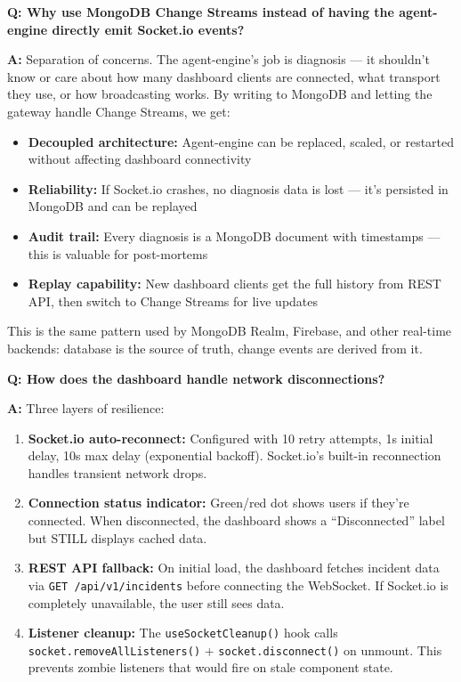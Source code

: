 \documentclass[11pt,a4paper]{article}
\begin{document}
\begin{interviewbox}
\textbf{Q: Why use MongoDB Change Streams instead of having the agent-engine directly emit Socket.io events?}

\textbf{A:} Separation of concerns. The agent-engine's job is diagnosis — it shouldn't know or care about how many dashboard clients are connected, what transport they use, or how broadcasting works. By writing to MongoDB and letting the gateway handle Change Streams, we get:

\begin{itemize}[leftmargin=*,itemsep=2pt]
  \item \textbf{Decoupled architecture:} Agent-engine can be replaced, scaled, or restarted without affecting dashboard connectivity
  \item \textbf{Reliability:} If Socket.io crashes, no diagnosis data is lost — it's persisted in MongoDB and can be replayed
  \item \textbf{Audit trail:} Every diagnosis is a MongoDB document with timestamps — this is valuable for post-mortems
  \item \textbf{Replay capability:} New dashboard clients get the full history from REST API, then switch to Change Streams for live updates
\end{itemize}

This is the same pattern used by MongoDB Realm, Firebase, and other real-time backends: database is the source of truth, change events are derived from it.
\end{interviewbox}

\begin{interviewbox}
\textbf{Q: How does the dashboard handle network disconnections?}

\textbf{A:} Three layers of resilience:

\begin{enumerate}[leftmargin=*,itemsep=2pt]
  \item \textbf{Socket.io auto-reconnect:} Configured with 10 retry attempts, 1s initial delay, 10s max delay (exponential backoff). Socket.io's built-in reconnection handles transient network drops.
  \item \textbf{Connection status indicator:} Green/red dot shows users if they're connected. When disconnected, the dashboard shows a ``Disconnected'' label but STILL displays cached data.
  \item \textbf{REST API fallback:} On initial load, the dashboard fetches incident data via \texttt{GET /api/v1/incidents} before connecting the WebSocket. If Socket.io is completely unavailable, the user still sees data.
  \item \textbf{Listener cleanup:} The \texttt{useSocketCleanup()} hook calls \texttt{socket.removeAllListeners()} + \texttt{socket.disconnect()} on unmount. This prevents zombie listeners that would fire on stale component state.
\end{enumerate}
\end{interviewbox}
\end{document}
